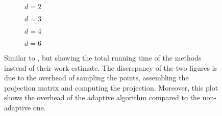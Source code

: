   \begin{figure}
	\centering
    \begin{subfigure}{0.49\textwidth}
      \renewcommand{\figlabel}{fig:total-time-vs-error-d2}
      
      \caption{$d=2$}
	\end{subfigure}
	\begin{subfigure}{0.5\textwidth}
      \renewcommand{\figlabel}{fig:total-time-vs-error-d3}
      
      \caption{$d=3$}
	\end{subfigure}
	\begin{subfigure}{0.49\textwidth}
      \renewcommand{\figlabel}{fig:total-time-vs-error-d4}
      
      \caption{$d=4$}
	\end{subfigure}
	\begin{subfigure}{0.5\textwidth}
      \renewcommand{\figlabel}{fig:total-time-vs-error-d6}
      
      \caption{$d=6$}
	\end{subfigure}
	\caption{Similar to , but showing the total
      running time of the methods instead of their work estimate. The
      discrepancy of the two figures is due to the overhead of
      sampling the points, assembling the projection matrix and
      computing the projection. Moreover, this plot shows the overhead
      of the adaptive algorithm compared to the non-adaptive one.}
	\label{fig:kink-time}
  \end{figure}




